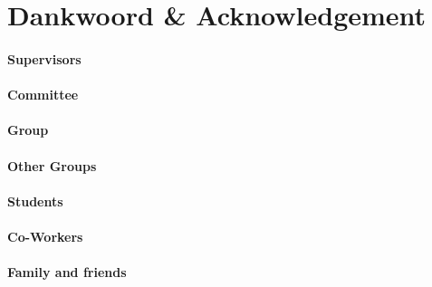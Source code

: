 \chapter*{Dankwoord \& Acknowledgement}
\subsubsection{Supervisors}
\subsubsection{Committee}
\subsubsection{Group}
\subsubsection{Other Groups}
\subsubsection{Students}
\subsubsection{Co-Workers}
\subsubsection{Family and friends}

\FloatBarrier


